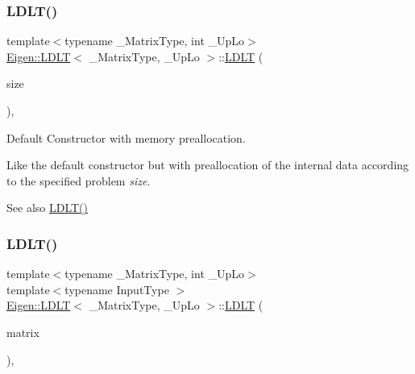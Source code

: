 \subsubsection{\texorpdfstring{LDLT()}{LDLT()}\hspace{0.1cm}{\footnotesize\ttfamily [2/4]}}
{\footnotesize\ttfamily template$<$typename \+\_\+\+Matrix\+Type, int \+\_\+\+Up\+Lo$>$ \\
\mbox{\hyperlink{class_eigen_1_1_l_d_l_t}{Eigen\+::\+L\+D\+LT}}$<$ \+\_\+\+Matrix\+Type, \+\_\+\+Up\+Lo $>$\+::\mbox{\hyperlink{class_eigen_1_1_l_d_l_t}{L\+D\+LT}} (\begin{DoxyParamCaption}\item[{\mbox{\hyperlink{class_eigen_1_1_l_d_l_t_ad9c57eb2fb3bbccd51b9d2e111bea355}{Index}}}]{size }\end{DoxyParamCaption})\hspace{0.3cm}{\ttfamily [inline]}, {\ttfamily [explicit]}}



Default Constructor with memory preallocation. 

Like the default constructor but with preallocation of the internal data according to the specified problem {\itshape size}. \begin{DoxySeeAlso}{See also}
\mbox{\hyperlink{class_eigen_1_1_l_d_l_t_a2e06dedd2651649c5b251fbf9ba4e7d4}{L\+D\+L\+T()}} 
\end{DoxySeeAlso}
\mbox{\label{class_eigen_1_1_l_d_l_t_ad0e8d2131ea1a626a08d98e9effb1cc5}} 
\subsubsection{\texorpdfstring{LDLT()}{LDLT()}\hspace{0.1cm}{\footnotesize\ttfamily [3/4]}}
{\footnotesize\ttfamily template$<$typename \+\_\+\+Matrix\+Type, int \+\_\+\+Up\+Lo$>$ \\
template$<$typename Input\+Type $>$ \\
\mbox{\hyperlink{class_eigen_1_1_l_d_l_t}{Eigen\+::\+L\+D\+LT}}$<$ \+\_\+\+Matrix\+Type, \+\_\+\+Up\+Lo $>$\+::\mbox{\hyperlink{class_eigen_1_1_l_d_l_t}{L\+D\+LT}} (\begin{DoxyParamCaption}\item[{const \mbox{\hyperlink{struct_eigen_1_1_eigen_base}{Eigen\+Base}}$<$ Input\+Type $>$ \&}]{matrix }\end{DoxyParamCaption})\hspace{0.3cm}{\ttfamily [inline]}, {\ttfamily [explicit]}}



